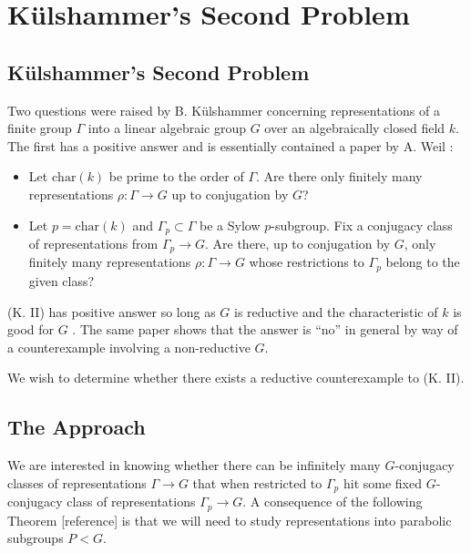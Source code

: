 
\chapter{K\"ulshammer's Second Problem}
\label{Chapter4}

\section{K\"ulshammer's Second Problem}

Two questions were raised by B. K\"ulshammer concerning representations of a finite group $\Gamma$ into a linear algebraic group $G$ over an algebraically closed field $k$. The first has a positive answer  and is essentially contained a paper by A. Weil \cite{weil1964remarks}:
\begin{itemize}
	\item[(K. I)] Let $\mathrm{char}(k)$ be prime to the order of $\Gamma$. Are there only finitely many representations $\rho:\Gamma\rightarrow G$ up to conjugation by $G$?
	\item[(K. II)] Let $p = \mathrm{char}(k)$ and $\Gamma_p \subset  \Gamma$ be a Sylow $p$-subgroup. Fix a conjugacy class of representations from $\Gamma_p\rightarrow G$. Are there, up to conjugation by $G$, only finitely many representations $\rho:\Gamma\rightarrow G$ whose restrictions to $\Gamma_p$ belong to the given class?
\end{itemize}

(K. II) has positive answer so long as $G$ is reductive and the characteristic of $k$ is good for $G$ \cite{slodowy1997two}. The same paper shows that the answer is ``no'' in general by way of a counterexample involving a non-reductive $G$.

We wish to determine whether there exists a reductive counterexample to (K. II).

\section{The Approach}

We are interested in knowing whether there can be infinitely many $G$-conjugacy classes of representations $\Gamma\rightarrow G$ that when restricted to $\Gamma_p$ hit some fixed $G$-conjugacy class of representations $\Gamma_p\rightarrow G$. A consequence of the following Theorem [reference] is that we will need to study representations into parabolic subgroups $P < G$.


